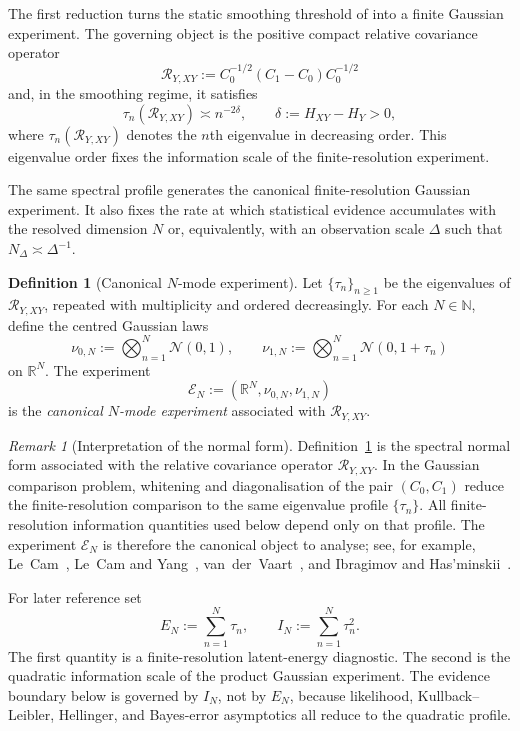 \documentclass[11pt,a4paper]{amsart}
\theoremstyle{plain}
\theoremstyle{definition}
\newtheorem{definition}[theorem]{Definition}
\theoremstyle{remark}
\newtheorem{remark}[theorem]{Remark}
\newcommand{\R}{\mathbb{R}}
\newcommand{\N}{\mathbb{N}}
\begin{document}
The first reduction turns the static smoothing threshold of \cite{vidal2026latent} into a finite
Gaussian experiment.  The governing object is the positive compact relative covariance operator
\[
\mathcal R_{Y,XY}:=C_0^{-1/2}(C_1-C_0)C_0^{-1/2}
\]
and, in the smoothing regime, it satisfies
\[
\tau_n(\mathcal R_{Y,XY})\asymp n^{-2\delta},
\qquad
\delta:=H_{XY}-H_Y>0,
\]
where \(\tau_n(\mathcal R_{Y,XY})\) denotes the \(n\)th eigenvalue in decreasing order.  This
eigenvalue order fixes the information scale of the finite-resolution experiment.

The same spectral profile generates the canonical finite-resolution Gaussian experiment.  It also
fixes the rate at which statistical evidence accumulates with the resolved dimension $N$ or,
equivalently, with an observation scale $\Delta$ such that $N_\Delta\asymp \Delta^{-1}$.

\begin{definition}[Canonical $N$-mode experiment]\label{def:EN}
Let $\{\tau_n\}_{n\ge1}$ be the eigenvalues of \(\mathcal R_{Y,XY}\), repeated with multiplicity and ordered
decreasingly. For each $N\in\N$, define the centred Gaussian laws
\[
\nu_{0,N}:=\bigotimes_{n=1}^N \mathcal N(0,1),
\qquad
\nu_{1,N}:=\bigotimes_{n=1}^N \mathcal N(0,1+\tau_n)
\]
on $\R^N$.  The experiment
\[
\mathcal E_N := (\R^N,\nu_{0,N},\nu_{1,N})
\]
is the \emph{canonical $N$-mode experiment} associated with \(\mathcal R_{Y,XY}\).
\end{definition}

\begin{remark}[Interpretation of the normal form]
Definition~\ref{def:EN} is the spectral normal form associated with the relative covariance
operator \(\mathcal R_{Y,XY}\).  In the Gaussian comparison problem, whitening and diagonalisation of
the pair $(C_0,C_1)$ reduce the finite-resolution comparison to the same eigenvalue profile
$\{\tau_n\}$.  All finite-resolution information quantities used below depend only on that profile.
The experiment $\mathcal E_N$ is therefore the canonical object to analyse; see, for example,
Le~Cam~\cite{LeCam86}, Le~Cam and Yang~\cite[Ch.~2]{LeCamYang00}, van~der~Vaart~\cite{vdV98}, and
Ibragimov and Has'minskii~\cite{IH81}.
\end{remark}

For later reference set
\[
        E_N:=\sum_{n=1}^N\tau_n,
        \qquad
        I_N:=\sum_{n=1}^N\tau_n^2.
\]
The first quantity is a finite-resolution latent-energy diagnostic.  The second is the quadratic
information scale of the product Gaussian experiment.  The evidence boundary below is governed by
\(I_N\), not by \(E_N\), because likelihood, Kullback--Leibler, Hellinger, and Bayes-error
asymptotics all reduce to the quadratic profile.
\end{document}
